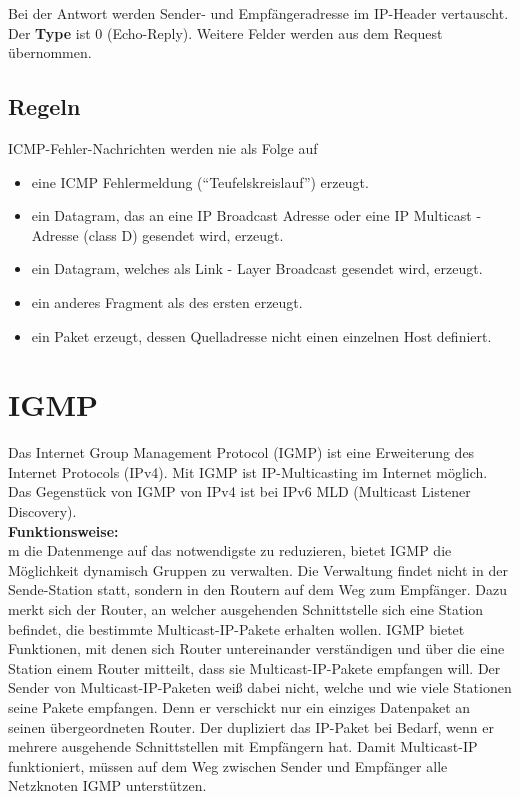 \documentclass{article} %
\begin{document}
Bei der Antwort werden Sender- und Empfängeradresse im IP-Header vertauscht.
Der \textbf{Type} ist 0 (Echo-Reply).
Weitere Felder werden aus dem Request übernommen.

\subsection{Regeln}
ICMP-Fehler-Nachrichten werden nie als Folge auf
\begin{itemize}
\item  eine ICMP Fehlermeldung ("`Teufelskreislauf"') erzeugt.
\item  ein Datagram, das an eine IP Broadcast Adresse oder eine IP
Multicast - Adresse (class D) gesendet wird, erzeugt.
\item  ein Datagram, welches als Link - Layer Broadcast gesendet
wird, erzeugt.
\item  ein anderes Fragment als des ersten erzeugt.
\item  ein Paket erzeugt, dessen Quelladresse nicht einen einzelnen Host definiert.
\end{itemize}


\section{IGMP}
Das Internet Group Management Protocol (IGMP) ist eine Erweiterung des Internet Protocols (IPv4). Mit IGMP ist IP-Multicasting im Internet möglich. Das Gegenstück von IGMP von IPv4 ist bei IPv6 MLD (Multicast Listener Discovery).\\

\noindent\textbf{Funktionsweise:}\\
m die Datenmenge auf das notwendigste zu reduzieren, bietet IGMP die Möglichkeit dynamisch Gruppen zu verwalten. Die Verwaltung findet nicht in der Sende-Station statt, sondern in den Routern auf dem Weg zum Empfänger. Dazu merkt sich der Router, an welcher ausgehenden Schnittstelle sich eine Station befindet, die bestimmte Multicast-IP-Pakete erhalten wollen. IGMP bietet Funktionen, mit denen sich Router untereinander verständigen und über die eine Station einem Router mitteilt, dass sie Multicast-IP-Pakete empfangen will. Der Sender von Multicast-IP-Paketen weiß dabei nicht, welche und wie viele Stationen seine Pakete empfangen. Denn er verschickt nur ein einziges Datenpaket an seinen übergeordneten Router. Der dupliziert das IP-Paket bei Bedarf, wenn er mehrere ausgehende Schnittstellen mit Empfängern hat. Damit Multicast-IP funktioniert, müssen auf dem Weg zwischen Sender und Empfänger alle Netzknoten IGMP unterstützen.
\end{document}
